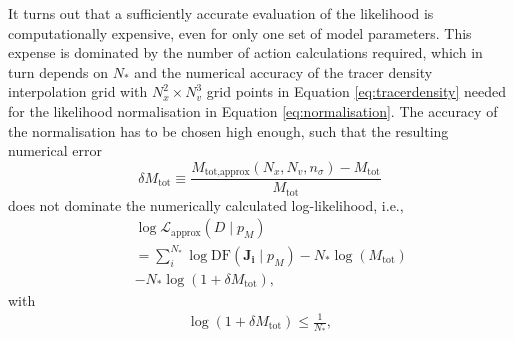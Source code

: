 \documentclass[iop,revtex4]{emulateapj}
\newcommand{\vect}[1]{\boldsymbol{#1}}
\newcommand{\pmodel}{\ensuremath{p_M}}
\begin{document}
It turns out that a sufficiently accurate evaluation of the likelihood is computationally expensive, even for only one set of model parameters. This expense is dominated by the number of action calculations required, which in turn depends on $N_*$ and the numerical accuracy of the tracer density interpolation grid with $N_x^2 \times N_v^3$ grid points in Equation \eqref{eq:tracerdensity} needed for the likelihood normalisation in Equation \eqref{eq:normalisation}. The accuracy of the normalisation has to be chosen high enough, such that the resulting numerical error 
\begin{equation}
\delta M_\text{tot} \equiv \frac{M_\text{tot,approx}(N_x,N_v,n_\sigma) -  M_\text{tot} }{M_\text{tot}}\label{eq:relerrlikelihood}
\end{equation}
does not dominate the numerically calculated log-likelihood, i.e.,
\begin{eqnarray}
& &\log \mathscr{L}_\text{approx}(D \mid \pmodel) \nonumber\\
&& = \sum_i^{N_*} \log \text{DF}(\vect{J_i} \mid \pmodel) - N_* \log(M_\text{tot})\nonumber\\
&& - N_* \log (1 + \delta M_\text{tot}),\label{eq:loglikelihood_relerr}
\end{eqnarray}
with
\begin{eqnarray}
\log (1 + \delta M_\text{tot}) \leq \frac{1}{N_{*}},\label{eq:accuracycondition}
\end{eqnarray}
\end{document}
